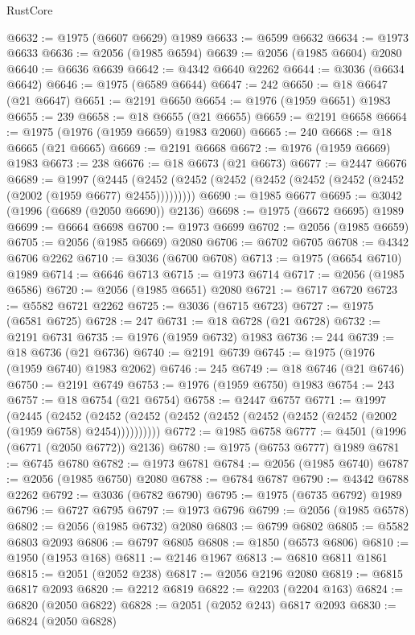 \begin{lexlean}{RustCore}
\begin{coremodule}
@6632 := @1975 (@6607 @6629) @1989
@6633 := @6599 @6632
@6634 := @1973 @6633
@6636 := @2056 (@1985 @6594)
@6639 := @2056 (@1985 @6604) @2080
@6640 := @6636 @6639
@6642 := @4342 @6640 @2262
@6644 := @3036 (@6634 @6642)
@6646 := @1975 (@6589 @6644)
@6647 := 242
@6650 := @18 @6647 (@21 @6647)
@6651 := @2191 @6650
@6654 := @1976 (@1959 @6651) @1983
@6655 := 239
@6658 := @18 @6655 (@21 @6655)
@6659 := @2191 @6658
@6664 := @1975 (@1976 (@1959 @6659) @1983 @2060)
@6665 := 240
@6668 := @18 @6665 (@21 @6665)
@6669 := @2191 @6668
@6672 := @1976 (@1959 @6669) @1983
@6673 := 238
@6676 := @18 @6673 (@21 @6673)
@6677 := @2447 @6676
@6689 := @1997
    (@2445 (@2452 (@2452 (@2452 (@2452 (@2452 (@2452 (@2452 (@2002 (@1959 @6677) @2455)))))))))
@6690 := @1985 @6677
@6695 := @3042 (@1996 (@6689 (@2050 @6690)) @2136)
@6698 := @1975 (@6672 @6695) @1989
@6699 := @6664 @6698
@6700 := @1973 @6699
@6702 := @2056 (@1985 @6659)
@6705 := @2056 (@1985 @6669) @2080
@6706 := @6702 @6705
@6708 := @4342 @6706 @2262
@6710 := @3036 (@6700 @6708)
@6713 := @1975 (@6654 @6710) @1989
@6714 := @6646 @6713
@6715 := @1973 @6714
@6717 := @2056 (@1985 @6586)
@6720 := @2056 (@1985 @6651) @2080
@6721 := @6717 @6720
@6723 := @5582 @6721 @2262
@6725 := @3036 (@6715 @6723)
@6727 := @1975 (@6581 @6725)
@6728 := 247
@6731 := @18 @6728 (@21 @6728)
@6732 := @2191 @6731
@6735 := @1976 (@1959 @6732) @1983
@6736 := 244
@6739 := @18 @6736 (@21 @6736)
@6740 := @2191 @6739
@6745 := @1975 (@1976 (@1959 @6740) @1983 @2062)
@6746 := 245
@6749 := @18 @6746 (@21 @6746)
@6750 := @2191 @6749
@6753 := @1976 (@1959 @6750) @1983
@6754 := 243
@6757 := @18 @6754 (@21 @6754)
@6758 := @2447 @6757
@6771 := @1997
    (@2445
      (@2452 (@2452 (@2452 (@2452 (@2452 (@2452 (@2452 (@2452 (@2002 (@1959 @6758) @2454))))))))))
@6772 := @1985 @6758
@6777 := @4501 (@1996 (@6771 (@2050 @6772)) @2136)
@6780 := @1975 (@6753 @6777) @1989
@6781 := @6745 @6780
@6782 := @1973 @6781
@6784 := @2056 (@1985 @6740)
@6787 := @2056 (@1985 @6750) @2080
@6788 := @6784 @6787
@6790 := @4342 @6788 @2262
@6792 := @3036 (@6782 @6790)
@6795 := @1975 (@6735 @6792) @1989
@6796 := @6727 @6795
@6797 := @1973 @6796
@6799 := @2056 (@1985 @6578)
@6802 := @2056 (@1985 @6732) @2080
@6803 := @6799 @6802
@6805 := @5582 @6803 @2093
@6806 := @6797 @6805
@6808 := @1850 (@6573 @6806)
@6810 := @1950 (@1953 @168)
@6811 := @2146 @1967
@6813 := @6810 @6811 @1861
@6815 := @2051 (@2052 @238)
@6817 := @2056 @2196 @2080
@6819 := @6815 @6817 @2093
@6820 := @2212 @6819
@6822 := @2203 (@2204 @163)
@6824 := @6820 (@2050 @6822)
@6828 := @2051 (@2052 @243) @6817 @2093
@6830 := @6824 (@2050 @6828)

\end{coremodule}
\end{lexlean}
